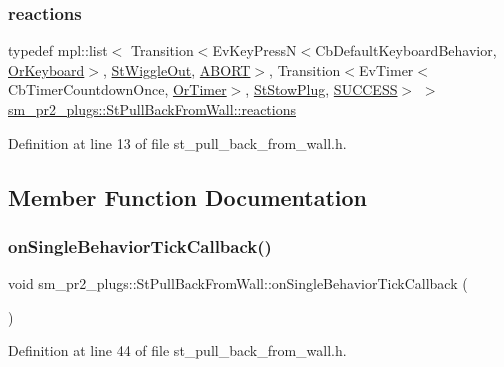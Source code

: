 \subsubsection{\texorpdfstring{reactions}{reactions}}
{\footnotesize\ttfamily typedef mpl\+::list$<$ Transition$<$Ev\+Key\+PressN$<$Cb\+Default\+Keyboard\+Behavior, \hyperlink{classsm__pr2__plugs_1_1OrKeyboard}{Or\+Keyboard}$>$, \hyperlink{structsm__pr2__plugs_1_1StWiggleOut}{St\+Wiggle\+Out}, \hyperlink{classABORT}{A\+B\+O\+RT}$>$, Transition$<$Ev\+Timer$<$Cb\+Timer\+Countdown\+Once, \hyperlink{classsm__pr2__plugs_1_1OrTimer}{Or\+Timer}$>$, \hyperlink{structsm__pr2__plugs_1_1StStowPlug}{St\+Stow\+Plug}, \hyperlink{classSUCCESS}{S\+U\+C\+C\+E\+SS}$>$ $>$ \hyperlink{structsm__pr2__plugs_1_1StPullBackFromWall_ae98bee2aa33bf23dc67a168be155e495}{sm\+\_\+pr2\+\_\+plugs\+::\+St\+Pull\+Back\+From\+Wall\+::reactions}}



Definition at line 13 of file st\+\_\+pull\+\_\+back\+\_\+from\+\_\+wall.\+h.



\subsection{Member Function Documentation}
\mbox{\label{structsm__pr2__plugs_1_1StPullBackFromWall_a42e04e36271bd14285b42df5c1988209}} 
\subsubsection{\texorpdfstring{on\+Single\+Behavior\+Tick\+Callback()}{onSingleBehaviorTickCallback()}}
{\footnotesize\ttfamily void sm\+\_\+pr2\+\_\+plugs\+::\+St\+Pull\+Back\+From\+Wall\+::on\+Single\+Behavior\+Tick\+Callback (\begin{DoxyParamCaption}{ }\end{DoxyParamCaption})\hspace{0.3cm}{\ttfamily [inline]}}



Definition at line 44 of file st\+\_\+pull\+\_\+back\+\_\+from\+\_\+wall.\+h.



